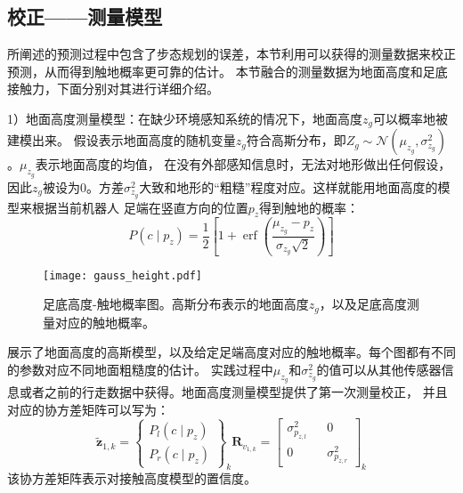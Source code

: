 \subsection{校正——测量模型}
所阐述的预测过程中包含了步态规划的误差，本节利用可以获得的测量数据来校正预测，从而得到触地概率更可靠的估计。
本节融合的测量数据为地面高度和足底接触力，下面分别对其进行详细介绍。

1）地面高度测量模型：在缺少环境感知系统的情况下，地面高度$z_g$可以概率地被建模出来。
假设表示地面高度的随机变量$z_g$符合高斯分布，即$Z_g \sim \mathcal{N}\left(\mu_{z_g}, \sigma_{z_g}^2\right)$。$\mu_{z_g}$表示地面高度的均值，
在没有外部感知信息时，无法对地形做出任何假设，因此$z_g$被设为0。方差$\sigma_{z_g}^2$大致和地形的“粗糙”程度对应。这样就能用地面高度的模型来根据当前机器人
足端在竖直方向的位置$p_z$得到触地的概率：
\begin{equation}
    \label{equ:est_height_prob}
    P\left(c \mid p_z\right)=\frac{1}{2}\left[1+\operatorname{erf}\left(\frac{\mu_{z_g}-p_z}{\sigma_{z_g} \sqrt{2}}\right)\right]
\end{equation}
\begin{figure}[htbp]
    \centering
    \texttt{[image: gauss\_height.pdf]}
    \caption{\label{fig:gauss_height}足底高度-触地概率图。高斯分布表示的地面高度${{z}_{g}}$，以及足底高度测量对应的触地概率。}
\end{figure}
展示了地面高度的高斯模型，以及给定足端高度对应的触地概率。每个图都有不同的参数对应不同地面粗糙度的估计。
实践过程中$\mu_{z_g}$和$\sigma_{z_g}^2$的值可以从其他传感器信息或者之前的行走数据中获得。地面高度测量模型提供了第一次测量校正，
并且对应的协方差矩阵可以写为：
\begin{equation}
    \label{equ:est_height_noise}
    \tilde{\boldsymbol{z}}_{1, k}=\left\{\begin{array}{c}
        P_l\left(c \mid p_z\right) \\
        P_r\left(c \mid p_z\right)
        \end{array}\right\}_k \boldsymbol{R}_{v_{1, k}}=\left[\begin{array}{ccc}
        \sigma_{p_{z, l}}^2 & & 0 \\
        0 & & \sigma_{p_{z, r}}^2
        \end{array}\right]_k
\end{equation}
该协方差矩阵表示对接触高度模型的置信度。

